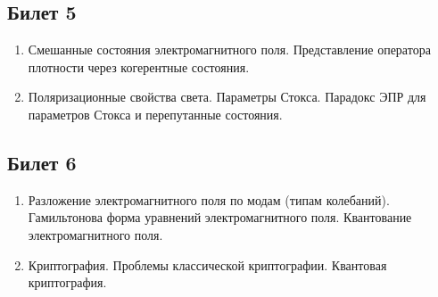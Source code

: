 \subsection*{Билет 5} 
\begin{enumerate}
\item Смешанные состояния электромагнитного поля.
Представление оператора плотности через когерентные
состояния. 
\item Поляризационные свойства света. Параметры Стокса. Парадокс ЭПР
  для параметров Стокса и перепутанные состояния.  
\end{enumerate}

\subsection*{Билет 6} 
\begin{enumerate}
\item Разложение электромагнитного поля по модам (типам колебаний).
Гамильтонова форма уравнений электромагнитного поля.
Квантование электромагнитного поля. 
\item Криптография. Проблемы классической криптографии. Квантовая
  криптография. 
\end{enumerate}




